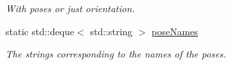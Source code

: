 \begin{DoxyCompactItemize}
\begin{DoxyCompactList}\small\item\em With poses or just orientation. \item\end{DoxyCompactList}\item 
\hypertarget{classannotationsHandle_a9f8a9eb79e7333ac9cc5df6dfd217398}{
static std::deque$<$ std::string $>$ \hyperlink{classannotationsHandle_a9f8a9eb79e7333ac9cc5df6dfd217398}{poseNames}}
\label{classannotationsHandle_a9f8a9eb79e7333ac9cc5df6dfd217398}

\begin{DoxyCompactList}\small\item\em The strings corresponding to the names of the poses. \item\end{DoxyCompactList}\end{DoxyCompactItemize}


